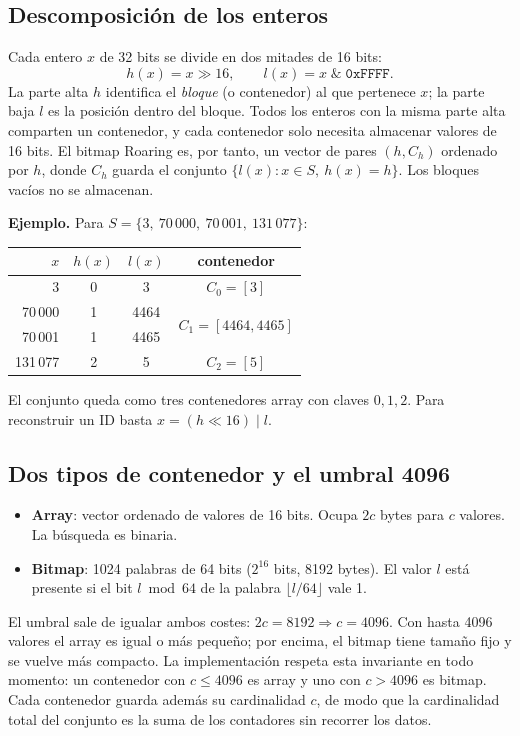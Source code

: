\documentclass[11pt,a4paper]{article}
\begin{document}
\subsection{Descomposición de los enteros}
Cada entero $x$ de 32 bits se divide en dos mitades de 16 bits:
\[
h(x) = x \gg 16, \qquad l(x) = x \;\&\; \texttt{0xFFFF}.
\]
La parte alta $h$ identifica el \emph{bloque} (o contenedor) al que pertenece $x$; la parte baja $l$ es la posición dentro del bloque. Todos los enteros con la misma parte alta comparten un contenedor, y cada contenedor solo necesita almacenar valores de 16 bits. El bitmap Roaring es, por tanto, un vector de pares $(h, C_h)$ ordenado por $h$, donde $C_h$ guarda el conjunto $\{l(x) : x\in S,\ h(x)=h\}$. Los bloques vacíos no se almacenan.

\textbf{Ejemplo.} Para $S=\{3,\ 70\,000,\ 70\,001,\ 131\,077\}$:
\begin{center}\small
\begin{tabular}{rccc}
\toprule
$x$ & $h(x)$ & $l(x)$ & contenedor \\
\midrule
3 & 0 & 3 & $C_0=[3]$ \\
70\,000 & 1 & 4464 & \multirow{2}{*}{$C_1=[4464,4465]$} \\
70\,001 & 1 & 4465 & \\
131\,077 & 2 & 5 & $C_2=[5]$ \\
\bottomrule
\end{tabular}
\end{center}
El conjunto queda como tres contenedores array con claves $0,1,2$. Para reconstruir un ID basta $x = (h \ll 16)\;|\;l$.

\subsection{Dos tipos de contenedor y el umbral 4096}
\begin{itemize}
\item \textbf{Array}: vector ordenado de valores de 16 bits. Ocupa $2c$ bytes para $c$ valores. La búsqueda es binaria.
\item \textbf{Bitmap}: 1024 palabras de 64 bits ($2^{16}$ bits, 8192 bytes). El valor $l$ está presente si el bit $l \bmod 64$ de la palabra $\lfloor l/64\rfloor$ vale 1.
\end{itemize}
El umbral sale de igualar ambos costes: $2c = 8192 \Rightarrow c = 4096$. Con hasta 4096 valores el array es igual o más pequeño; por encima, el bitmap tiene tamaño fijo y se vuelve más compacto. La implementación respeta esta invariante en todo momento: un contenedor con $c\le4096$ es array y uno con $c>4096$ es bitmap. Cada contenedor guarda además su cardinalidad $c$, de modo que la cardinalidad total del conjunto es la suma de los contadores sin recorrer los datos.
\end{document}
